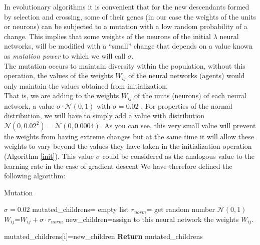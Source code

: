 \documentclass{iosart2c}
\begin{document}
In evolutionary algorithms it is convenient that for the new descendants formed by selection and crossing, some of their genes (in our case the weights of the units or neurons) can be subjected to a mutation with a low random probability of a change. This implies that some weights of the neurons of the initial $\lambda$ neural networks, will be modified with a ``small'' change that depends on a value known as \textit{mutation power} \cite{deepGA} to which we will call $\sigma$. \\

The mutation occurs to maintain diversity within the population, without this operation, the values of the weights $W_{ij}$ of the neural networks (agents) would only maintain the values obtained from initialization.\\

That is, we are adding to the weights $W_{ij}$ of the units (neurons) of each neural network, a value $\sigma\cdot \mathcal{N}(0,1)$ with $\sigma=0.02$ . For properties of the normal distribution, we will have to simply add a value with distribution $\mathcal{N}(0,0.02^2)=\mathcal{N}(0,0.0004)$. As you can see, this very small value will prevent the weights from having extreme changes but at the same time it will allow these weights to vary beyond the values they have taken in the initialization operation (Algorithm \ref{init}). This value $\sigma$ could be considered as the analogous value to the learning rate in the case of gradient descent We have therefore defined the following algorithm: \\



\begin{algorithm}[h!]
\caption{Mutation} \label{mutation}
\begin{algorithmic}[1]
\State $\sigma=0.02$ 
\State mutated\_childrens= empty list
     
                \State $r_{norm}$= get random number $\mathcal{N}(0,1)$
                \State $W_{ij}$=$W_{ij}+\sigma\cdot r_{norm}$ 
                \State new\_children=assign to this neural network the weights $W_{ij}$.
            
\EndFor
        \State mutated\_childrens[i]=new\_children
\EndFor
\State \textbf{Return} mutated\_childrens
\EndFunction
\end{algorithmic}
\end{algorithm}
\end{document}
